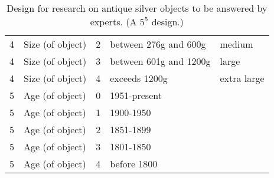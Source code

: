 \documentclass{article}
\begin{document}
\begin{table}[!hb]
\begin{tabular}{@{}clcll@{}}
4 & Size (of object)     & 2 & between 276g and 600g      & medium               \\
4 & Size (of object)     & 3 & between 601g and 1200g     & large                \\
4 & Size (of object)     & 4 & exceeds 1200g              & extra large          \\
5 & Age (of object)      & 0 & 1951-present &                  \\
5 & Age (of object)      & 1 & 1900-1950 &                     \\
5 & Age (of object)      & 2 & 1851-1899 &                    \\
5 & Age (of object)      & 3 & 1801-1850 &                     \\
5 & Age (of object)      & 4 & before 1800 &
\\ \bottomrule
\end{tabular}
\caption{Design for research on antique silver objects to be answered by experts. (A $5^5$ design.)}
\label{tab:design-ordered-silver}
\end{table}
\end{document}
